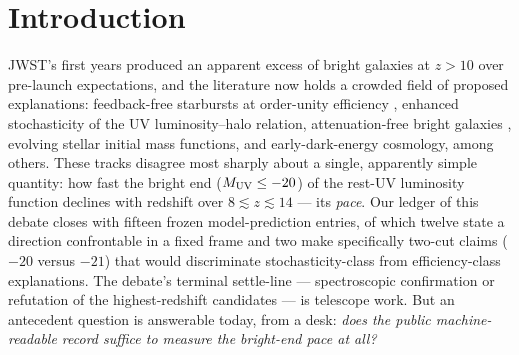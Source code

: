 \documentclass[twocolumn]{aastex702}
\begin{document}
\begin{abstract}
landing exactly on tabulated values, leaves even the existence of one cumulative
undecided; another inherits its geometry row by row from donor studies; (iv) a
pre-registered paper-text receipt pass, one pass per table, confirms the missing
statements are simply not there. No pace confrontation survives on any roster source, and no
published-LF source populates the $[10,11.5)$ slice---a statement about that roster, not
about the census, which holds 176 objects there at $M_{\rm UV}\le-20$. We present this as a reproducibility
finding about the JWST-era bright-end record: every threshold, slice, and verdict was
frozen in advance, every closure carries its documented reason, and for one of the three published tables a single clause of bin geometry would have
changed the outcome---the other two need more, one lacking a stated redshift interval and
one inheriting its geometry row by row.
\end{abstract}

\section{Introduction} \label{sec:intro}

JWST's first years produced an apparent excess of bright galaxies at $z>10$ over
pre-launch expectations, and the literature now holds a crowded field of proposed
explanations: feedback-free starbursts at order-unity efficiency \citep{dekel23},
enhanced stochasticity of the UV luminosity--halo relation, attenuation-free bright
galaxies \citep{ferrara23}, evolving stellar initial mass functions, and early-dark-energy
cosmology, among others. These tracks disagree most sharply about a single, apparently
simple quantity: how fast the bright end ($M_{\rm UV}\le-20$) of the rest-UV luminosity
function declines with redshift over $8\lesssim z\lesssim14$ --- its \emph{pace}. Our
ledger of this debate closes with fifteen frozen model-prediction entries, of which twelve
state a direction confrontable in a fixed frame and two make specifically two-cut claims
($-20$ versus $-21$) that would discriminate stochasticity-class from efficiency-class
explanations. The debate's terminal settle-line --- spectroscopic confirmation or refutation
of the highest-redshift candidates --- is telescope work. But an antecedent question is
answerable today, from a desk: \emph{does the public machine-readable record suffice to
measure the bright-end pace at all?}
\end{document}

